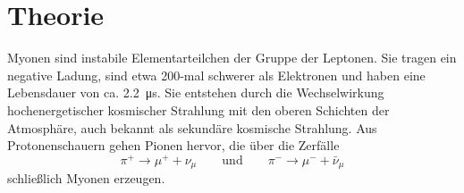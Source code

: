 \section{Theorie}
\label{sec:Theorie}

Myonen sind instabile Elementarteilchen der Gruppe der Leptonen. 
Sie tragen ein negative Ladung, sind etwa 200-mal schwerer als Elektronen 
und haben eine Lebensdauer von ca. \qty{2,2}{\micro\second}.
Sie entstehen durch die Wechselwirkung hochenergetischer kosmischer Strahlung
mit den oberen Schichten der Atmosphäre,
auch bekannt als sekundäre kosmische Strahlung.
Aus Protonenschauern gehen Pionen hervor,
die über die Zerfälle
\begin{equation*}
    \pi^{+} \rightarrow \mu^{+}+\nu_\mu \qquad \text {und} \qquad \pi^{-} \rightarrow \mu^{-}+\bar{\nu}_\mu
\end{equation*}
schließlich Myonen erzeugen.

